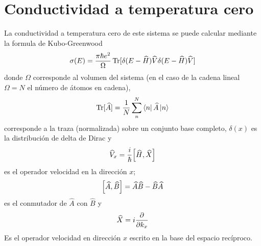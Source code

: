 \section{Conductividad a temperatura cero}
	
La conductividad a temperatura cero de este sistema se puede calcular mediante la formula de Kubo-Greenwood \autocite{Greenwood1958}
\begin{equation}\label{eq:KuboGreenwood}
	\sigma(E) = \frac{\pi \hbar e^2}{\Omega}\Trace[\delta(E - \widehat{H})\widehat{V}\delta(E - \widehat{H})\widehat{V}]
\end{equation}
donde $\Omega$ corresponde al volumen del sistema (en el caso de la cadena lineal $ \Omega = N $ el número de átomos en cadena), 
\begin{equation}\label{eq:trace}
	\Trace[\widehat{A}] = \frac{1}{N}\sum_n^N \bra{n}\widehat{A}\ket{n}
\end{equation}
corresponde a la traza (normalizada) sobre un conjunto base completo, $\delta(x)$ es la distribución de delta de Dirac y 
\begin{equation}\label{eq:VelocityOP}
	\widehat{V}_x = \frac{i}{\hbar} \comm{\widehat{H}}{\widehat{X}}
\end{equation}
es el operador velocidad en la dirección $x$; 
\begin{equation}\label{eq:comm}
	\comm{\widehat A}{\widehat B} = \widehat{A}\widehat{B} - \widehat{B}\widehat{A}
\end{equation}
es el conmutador de $\widehat{A}$ con $\widehat{B}$ y 
\begin{equation}\label{eq:positionOP}
	\widehat{X} = i \pdv{k_x}
\end{equation}
Es el operador velocidad en dirección $x$ escrito en la base del espacio recíproco.


